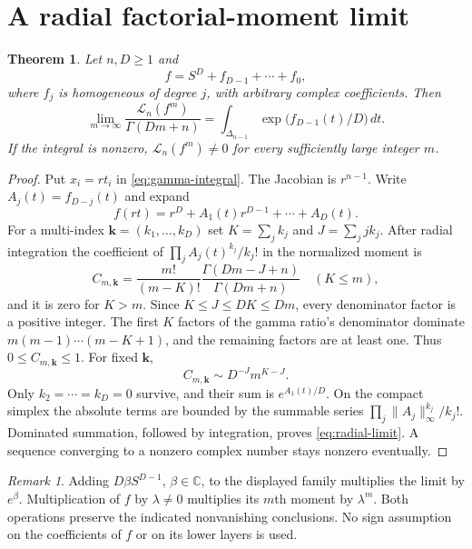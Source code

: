 \documentclass[11pt]{article}
\numberwithin{equation}{section}
\newtheorem{theorem}{Theorem}[section]
\theoremstyle{definition}
\theoremstyle{remark}
\newtheorem{remark}[remark]{Remark}
\newcommand{\C}{\mathbb C}
\newcommand{\Lcal}{\mathcal L}
\begin{document}
\section{A radial factorial-moment limit}
\begin{theorem}\label{thm:radial}
Let $n,D\ge1$ and
\[
 f=S^D+f_{D-1}+\cdots+f_0,
\]
where $f_j$ is homogeneous of degree $j$, with arbitrary complex
coefficients. Then
\begin{equation}\label{eq:radial-limit}
 \lim_{m\to\infty}\frac{\Lcal_n(f^m)}{\Gamma(Dm+n)}
 =\int_{\Delta_{n-1}}\exp\bigl(f_{D-1}(t)/D\bigr)\,dt.
\end{equation}
If the integral is nonzero, $\Lcal_n(f^m)\ne0$ for every sufficiently large
integer $m$.
\end{theorem}
\begin{proof}
Put $x_i=rt_i$ in \eqref{eq:gamma-integral}. The Jacobian is $r^{n-1}$.
Write $A_j(t)=f_{D-j}(t)$ and expand
\[
 f(rt)=r^D+A_1(t)r^{D-1}+\cdots+A_D(t).
\]
For a multi-index $\mathbf k=(k_1,\ldots,k_D)$ set
$K=\sum_j k_j$ and $J=\sum_j jk_j$. After radial integration the coefficient
of $\prod_j A_j(t)^{k_j}/k_j!$ in the normalized moment is
\[
 C_{m,\mathbf k}=
 \frac{m!}{(m-K)!}\frac{\Gamma(Dm-J+n)}{\Gamma(Dm+n)}
 \quad(K\le m),
\]
and it is zero for $K>m$. Since $K\le J\le DK\le Dm$, every denominator
factor is a positive integer. The first $K$ factors of the gamma ratio's
denominator dominate $m(m-1)\cdots(m-K+1)$, and the remaining factors are
at least one. Thus $0\le C_{m,\mathbf k}\le1$.
For fixed $\mathbf k$,
\[
 C_{m,\mathbf k}\sim D^{-J}m^{K-J}.
\]
Only $k_2=\cdots=k_D=0$ survive, and their sum is $e^{A_1(t)/D}$.
On the compact simplex the absolute terms are bounded by the summable
series $\prod_j\|A_j\|_\infty^{k_j}/k_j!$. Dominated summation, followed by
integration, proves \eqref{eq:radial-limit}. A sequence converging to a
nonzero complex number stays nonzero eventually.
\end{proof}

\begin{remark}\label{rem:scalars}
Adding $D\beta S^{D-1}$, $\beta\in\C$, to the displayed family multiplies
the limit by $e^\beta$. Multiplication of $f$ by $\lambda\ne0$ multiplies
its $m$th moment by $\lambda^m$. Both operations preserve the indicated
nonvanishing conclusions. No sign assumption on the coefficients of $f$
or on its lower layers is used.
\end{remark}
\end{document}
